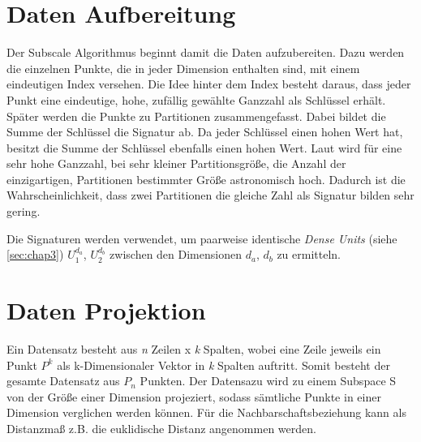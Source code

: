 \section{Daten Aufbereitung}

Der Subscale Algorithmus beginnt damit die Daten aufzubereiten. Dazu werden die einzelnen Punkte,
die in jeder Dimension enthalten sind, mit einem eindeutigen Index versehen. Die Idee hinter dem
Index besteht daraus, dass jeder Punkt eine eindeutige, hohe, zufällig gewählte Ganzzahl als
Schlüssel erhält. Später werden die Punkte zu Partitionen zusammengefasst. Dabei bildet die Summe
der Schlüssel die Signatur ab. Da jeder Schlüssel einen hohen Wert hat, besitzt die Summe der
Schlüssel ebenfalls einen hohen Wert. Laut \cite{Kaur.2014} wird für eine sehr hohe Ganzzahl, bei
sehr kleiner
Partitionsgröße, die Anzahl der einzigartigen, Partitionen bestimmter Größe astronomisch hoch.
Dadurch ist die Wahrscheinlichkeit, dass zwei Partitionen die gleiche Zahl als Signatur bilden
sehr gering.

Die Signaturen werden verwendet, um paarweise identische \emph{Dense Units} (siehe
\ref{sec:chap3}) $U_1^{d_a}$, $U_2^{d_b}$ zwischen den Dimensionen $d_a$, $d_b$ zu ermitteln.


\section{Daten Projektion}

Ein Datensatz besteht aus \emph{n} Zeilen x \emph{k} Spalten, wobei eine Zeile jeweils ein Punkt
$P^{k}$ als k-Dimensionaler Vektor in \emph{k} Spalten auftritt. Somit besteht der gesamte
Datensatz aus $P_{n}$ Punkten.
Der Datensazu wird zu einem Subspace S von der Größe einer Dimension projeziert, sodass sämtliche
Punkte in einer Dimension verglichen werden können. Für die Nachbarschaftsbeziehung kann als
Distanzmaß z.B. die euklidische Distanz angenommen werden.
